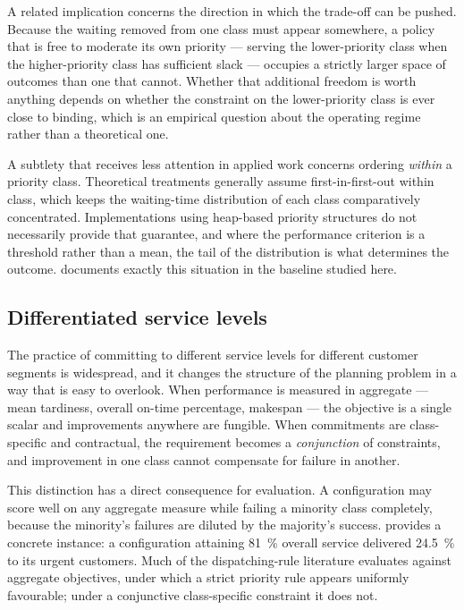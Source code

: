 A related implication concerns the direction in which the trade-off can be pushed. Because the
waiting removed from one class must appear somewhere, a policy that is free to moderate its own
priority --- serving the lower-priority class when the higher-priority class has sufficient
slack --- occupies a strictly larger space of outcomes than one that cannot. Whether that
additional freedom is worth anything depends on whether the constraint on the lower-priority
class is ever close to binding, which is an empirical question about the operating regime rather
than a theoretical one.

A subtlety that receives less attention in applied work concerns ordering \emph{within} a
priority class. Theoretical treatments generally assume first-in-first-out within class, which
keeps the waiting-time distribution of each class comparatively concentrated. Implementations
using heap-based priority structures do not necessarily provide that guarantee, and where the
performance criterion is a threshold rather than a mean, the tail of the distribution is what
determines the outcome.  documents exactly this situation in the baseline
studied here.

\subsection{Differentiated service levels}

The practice of committing to different service levels for different customer segments is
widespread, and it changes the structure of the planning problem in a way that is easy to
overlook. When performance is measured in aggregate --- mean tardiness, overall on-time
percentage, makespan --- the objective is a single scalar and improvements anywhere are
fungible. When commitments are class-specific and contractual, the requirement becomes a
\emph{conjunction} of constraints, and improvement in one class cannot compensate for failure in
another.

This distinction has a direct consequence for evaluation. A configuration may score well on any
aggregate measure while failing a minority class completely, because the minority's failures are
diluted by the majority's success.  provides a concrete instance: a
configuration attaining \SI{81}{\percent} overall service delivered \SI{24.5}{\percent} to its
urgent customers. Much of the dispatching-rule literature evaluates against aggregate
objectives, under which a strict priority rule appears uniformly favourable; under a
conjunctive class-specific constraint it does not.

